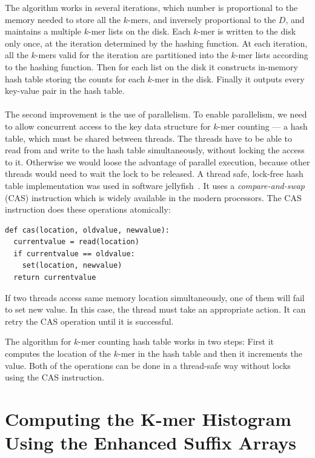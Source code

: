 The algorithm works in several iterations, which number is proportional to the memory needed to store all the $k$-mers, and inversely proportional to the $D$, and maintains a multiple $k$-mer lists on the disk.
Each $k$-mer is written to the disk only once, at the iteration determined by the hashing function.
At each iteration, all the $k$-mers valid for the iteration are partitioned into the $k$-mer lists according to the hashing function.
Then for each list on the disk it constructs in-memory hash table storing the counts for each $k$-mer in the disk.
Finally it outputs every key-value pair in the hash table.

\paragraph{} The second improvement is the use of parallelism. To enable parallelism, we need to allow concurrent access to the key data structure for $k$-mer counting --- a hash table, which must be shared between threads. The threads have to be able to read from and write to the hash table simultaneously, without locking the access to it. Otherwise we would loose the advantage of parallel execution, because other threads would need to wait the lock to be released. A thread safe, lock-free hash table implementation was used in software jellyfish~\cite{jellyfish}. It uses a \emph{compare-and-swap} (CAS) instruction which is widely available in the modern processors. The CAS instruction does these operations atomically:
\begin{lstlisting}
def cas(location, oldvalue, newvalue):
  currentvalue = read(location)
  if currentvalue == oldvalue:
    set(location, newvalue)
  return currentvalue
\end{lstlisting}
If two threads access same memory location simultaneously, one of them will fail to set new value. In this case, the thread must take an appropriate action.
It can retry the CAS operation until it is successful.

The algorithm for $k$-mer counting hash table works in two steps:
First it computes the location of the $k$-mer in the hash table and then it increments the value. Both of the operations can be done in a thread-safe way without locks using the CAS instruction.

\section[Enhanced Suffix Arrays]{Computing the K-mer Histogram Using the Enhanced Suffix Arrays}

